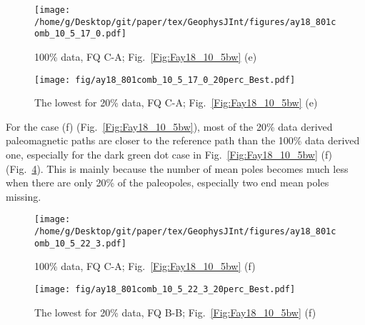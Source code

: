 \begin{figure*}[tbp]
  \captionsetup[subfigure]{labelformat=empty,aboveskip=-6pt,belowskip=-6pt}
  \centering
  \begin{subfigure}[htbp]{.49\textwidth}
    \captionsetup{skip=0pt}
    \centering
    \texttt{[image: /home/g/Desktop/git/paper/tex/GeophysJInt/figures/ay18\_801comb\_10\_5\_17\_0.pdf]}
	\caption{100\% data, FQ C-A; Fig.~\ref{Fig:Fay18_10_5bw}
	(e)}\label{Fig:Fay18_10_5b801}
  \end{subfigure}
  \begin{subfigure}[htbp]{.49\textwidth}
    \captionsetup{skip=0pt}
    \centering
    \texttt{[image: fig/ay18\_801comb\_10\_5\_17\_0\_20perc\_Best.pdf]} %
    \caption{The lowest for 20\% data, FQ C-A;
	Fig.~\ref{Fig:Fay18_10_5bw} (e)}\label{Fig:Fay18_10_5b801l20p}
  \end{subfigure}
  \caption[Less data, better similarity?]{Comparing the 100\% Australian
  120 Ma paleomagnetic data derived result with the best of the only
  20\% data derived results (the dark green dot in Fig.~\ref{Fig:Fay18_10_5bw}
  (e)).}\label{Fig:Fay18_10_5b801l20p_vs_100p}
\end{figure*}

For the case (f) (Fig.~\ref{Fig:Fay18_10_5bw}), most of the 20\% data derived
paleomagnetic paths are closer to the reference path than the 100\% data derived
one, especially for the dark green dot case in Fig.~\ref{Fig:Fay18_10_5bw} (f)
(Fig.~\ref{Fig:Fay18_10_5w801l20p}). This is mainly because the number of mean
poles becomes much less when there are only 20\% of the paleopoles, especially
two end mean poles missing.

\begin{figure*}[tbp]
  \captionsetup[subfigure]{labelformat=empty,aboveskip=-6pt,belowskip=-6pt}
  \centering
  \begin{subfigure}[htbp]{.49\textwidth}
    \captionsetup{skip=0pt}
    \centering
    \texttt{[image: /home/g/Desktop/git/paper/tex/GeophysJInt/figures/ay18\_801comb\_10\_5\_22\_3.pdf]}
	\caption{100\% data, FQ C-A; Fig.~\ref{Fig:Fay18_10_5bw}
	(f)}\label{Fig:Fay18_10_5w801}
  \end{subfigure}
  \begin{subfigure}[htbp]{.49\textwidth}
    \captionsetup{skip=0pt}
    \centering
    \texttt{[image: fig/ay18\_801comb\_10\_5\_22\_3\_20perc\_Best.pdf]} %
    \caption{The lowest for 20\% data, FQ B-B;
	Fig.~\ref{Fig:Fay18_10_5bw} (f)}\label{Fig:Fay18_10_5w801l20p}
  \end{subfigure}
  \caption[Less data, better similarity?]{Comparing the 100\% Australian
  120 Ma paleomagnetic data derived result with the best of the only
  20\% data derived results (the dark green dot in Fig.~\ref{Fig:Fay18_10_5bw}
  (f)).}\label{Fig:Fay18_10_5w801l20p_vs_100p}
\end{figure*}


